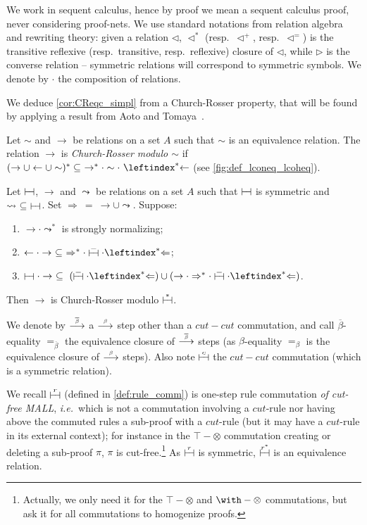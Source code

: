 \documentclass{lmcs}
\newcommand*{\tens}{\otimes} %
\newcommand*{\ie}{\emph{i.e.}}
\newcommand*{\resp}{resp.}
\newcommand*{\eqeq}{=} %
\newcommand{\symboltext}[2]{\mathrel{\overset{\makebox[0pt]{\mbox{\normalfont\tiny\sffamily \ensuremath{#1}}}}{#2}}} %
\newcommand{\betabar}{\overline{\beta}}
\newcommand{\betato}{\symboltext{\beta}{\longrightarrow}}
\newcommand{\betabarto}{\symboltext{\betabar}{\longrightarrow}}
\newcommand{\vdashv}{\mathrel{\lower .22ex \hbox{$\vdash\!\dashv$}}}
\DeclareRobustCommand{\astsymbol}[1]{\mathrel{\ooalign{{$\vdashv$}\crcr{$\stackrel{#1}{\hphantom{\vdashv}\vphantom{\to}}$}}}}
\DeclareRobustCommand{\astvdashv}{\astsymbol{\ast}}
\DeclareRobustCommand{\vdashveq}{\astsymbol{=}}
\newcommand{\eqcone}{\astsymbol{r}} %
\newcommand{\eqc}{\astsymbol{r^\ast}} %
\newcommand{\eqcc}{\astsymbol{c}} %
\newcommand{\eqb}{\mathrel{\eqeq_{\beta}}}
\newcommand{\eqbb}{\mathrel{\eqeq_{\betabar}}}
\begin{document}
We work in sequent calculus, hence by proof we mean a sequent calculus proof, never considering proof-nets.
We use standard notations from relation algebra and rewriting theory: given a relation $\lhd$, $\lhd^*$ (\resp\ $\lhd^+$, \resp\ $\lhd^=$) is the transitive reflexive (\resp\ transitive, \resp\ reflexive) closure of $\lhd$, while $\rhd$ is the converse relation -- symmetric relations will correspond to symmetric symbols.
We denote by $\cdot$ the composition of relations.

We deduce \autoref{cor:CReqc_simpl} from a Church-Rosser property, that will be found by applying a result from Aoto and Tomaya~\cite{aototoyama2012}.

\begin{defi}
\label{def:creq}
Let $\sim$ and $\to$ be relations on a set $A$ such that $\sim$ is an equivalence relation.
The relation $\to$ is \emph{Church-Rosser modulo $\sim$} if $(\to\cup\gets\cup\sim)^*\subseteq ~\to^*\cdot\sim\cdot~\leftindex^*{\gets}$ (see \autoref{fig:def_lconeq_lcoheq}).
\end{defi}

\begin{thmC}
\label{lem:aototomaya}
Let $\vdashv$, $\to$ and $\leadsto$ be relations on a set $A$ such that $\vdashv$ is symmetric and $\leadsto~\subseteq~\vdashv$.
Set ${\Rightarrow~=~\to \cup \leadsto}$.
Suppose:
\begin{enumerate}[label=\textnormal{(\roman*)}]
\item\label{item:aototomaya:1}
$\to \cdot \leadsto^*$ is strongly normalizing;
\item\label{item:aototomaya:2}
$\gets \cdot \to~\subseteq~\Rightarrow^* \cdot \vdashveq \cdot \leftindex^*{\Leftarrow}$;
\item\label{item:aototomaya:3}
$\vdashv \cdot \to~\subseteq~(\vdashveq \cdot \leftindex^*{\Leftarrow}) \cup (\to \cdot \Rightarrow^* \cdot \vdashveq \cdot \leftindex^*{\Leftarrow})$.
\end{enumerate}
Then $\to$ is Church-Rosser modulo $\astvdashv$.
\end{thmC}

We denote by $\betabarto$ a $\betato$ step other than a $cut-cut$ commutation, and call $\betabar$-equality $\eqbb$ the equivalence closure of $\betabarto$ steps (as $\beta$-equality $\eqb$ is the equivalence closure of $\betato$ steps).
Also note $\eqcc$ the $cut-cut$ commutation (which is a symmetric relation).

We recall $\eqcone$ (defined in \autoref{def:rule_comm}) is one-step rule commutation \emph{of cut-free MALL}, \ie\ which is not a commutation involving a $cut$-rule nor having above the commuted rules a sub-proof with a $cut$-rule (but it may have a $cut$-rule in its external context); for instance in the $\top-\tens$ commutation creating or deleting a sub-proof $\pi$, $\pi$ is cut-free.\footnote{Actually, we only need it for the $\top-\tens$ and $\with-\tens$ commutations, but ask it for all commutations to homogenize proofs.}
As $\eqcone$ is symmetric, $\eqc$ is an equivalence relation.
\end{document}
